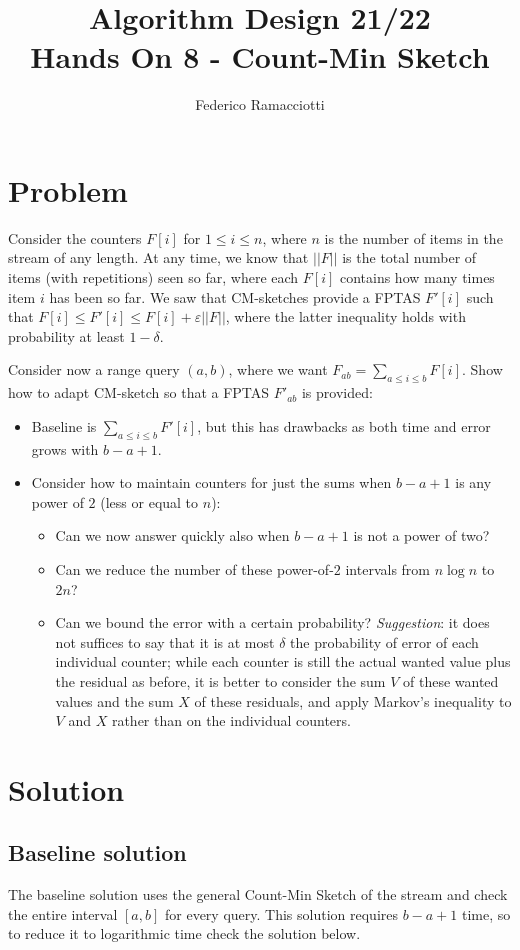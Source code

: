 \documentclass{article}
\title{\LARGE{\textbf{Algorithm Design 21/22}}\\ \vspace{1cm} Hands On 8 - Count-Min Sketch}
\author{Federico Ramacciotti}
\date{}
\begin{document}
\maketitle

\section{Problem}
Consider the counters $F[i]$ for $1 \leq i \leq n$, where $n$ is the number of items in the stream of any length. At any time, we know that $||F||$ is the total number of items (with repetitions) seen so far, where each $F[i]$ contains how many times item $i$ has been so far. We saw that CM-sketches provide a FPTAS $F'[i]$ such that $F[i] \leq F'[i] \leq F[i] + \varepsilon ||F||$, where the latter inequality holds with probability at least $1 - \delta$.

Consider now a range query $(a,b)$, where we want $F_{ab} =\sum_{a \leq i \leq b} F[i]$. Show how to adapt CM-sketch so that a FPTAS $F'_{ab}$ is provided:
\begin{itemize}
    \item Baseline is $\sum_{a \leq i \leq b} F'[i]$, but this has drawbacks as both time and error grows with $b-a+1$.
    \item Consider how to maintain counters for just the sums when $b-a+1$ is any power of $2$ (less or equal to $n$):
    \begin{itemize}
        \item Can we now answer quickly also when $b-a+1$ is not a power of two?
	    \item Can we reduce the number of these power-of-$2$ intervals from $n \log n$ to $2n$?
	    \item Can we bound the error with a certain probability? \textit{Suggestion}: it does not suffices to say that it is at most $\delta$ the probability of error of each individual counter; while each counter is still the actual wanted value plus the residual as before, it is better to consider the sum $V$ of these wanted values and the sum $X$ of these residuals, and apply Markov’s inequality to $V$ and $X$ rather than on the individual counters.
    \end{itemize}
\end{itemize}

\section{Solution}
\subsection{Baseline solution}
The baseline solution uses the general Count-Min Sketch of the stream and check the entire interval $[a,b]$ for every query. This solution requires $b-a+1$ time, so to reduce it to logarithmic time check the solution below.
\end{document}
